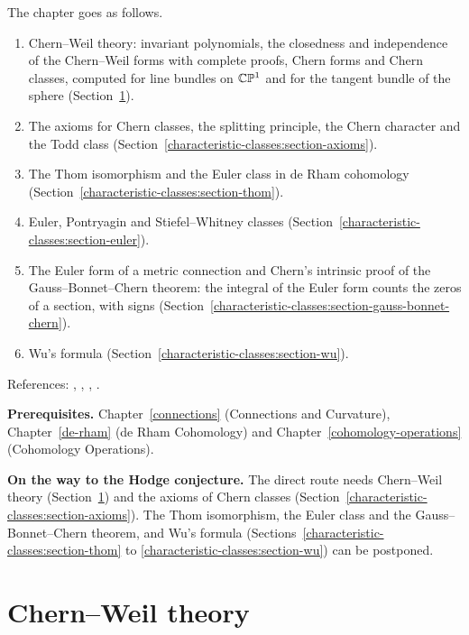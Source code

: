 The chapter goes as follows.
\begin{enumerate}
\item Chern--Weil theory: invariant polynomials, the closedness and independence of the Chern--Weil forms with complete proofs, Chern forms and Chern classes, computed
for line bundles on $\mathbb{C}\mathbb{P}^1$ and for the tangent bundle of the sphere (Section~\ref{characteristic-classes:section-chern-weil}).
\item The axioms for Chern classes, the splitting principle, the Chern character and the Todd class (Section~\ref{characteristic-classes:section-axioms}).
\item The Thom isomorphism and the Euler class in de Rham cohomology (Section~\ref{characteristic-classes:section-thom}).
\item Euler, Pontryagin and Stiefel--Whitney classes (Section~\ref{characteristic-classes:section-euler}).
\item The Euler form of a metric connection and Chern's intrinsic proof of the Gauss--Bonnet--Chern theorem: the integral of the Euler form counts the zeros of a section, with
signs (Section~\ref{characteristic-classes:section-gauss-bonnet-chern}).
\item Wu's formula (Section~\ref{characteristic-classes:section-wu}).
\end{enumerate}
References: \cite{milnor-stasheff}, \cite{bott-tu}, \cite{hirzebruch-topological}, \cite[Chapter 1]{griffiths-harris}.

\noindent\textbf{Prerequisites.} Chapter~\ref{connections} (Connections and Curvature), Chapter~\ref{de-rham} (de Rham Cohomology)
and Chapter~\ref{cohomology-operations} (Cohomology Operations).

\noindent\textbf{On the way to the Hodge conjecture.} The direct route needs Chern--Weil theory (Section~\ref{characteristic-classes:section-chern-weil}) and the axioms of Chern classes (Section~\ref{characteristic-classes:section-axioms}). The Thom isomorphism, the
Euler class and the Gauss--Bonnet--Chern theorem, and Wu's formula (Sections~\ref{characteristic-classes:section-thom} to \ref{characteristic-classes:section-wu}) can be postponed.

\section{Chern--Weil theory}\label{characteristic-classes:section-chern-weil}

